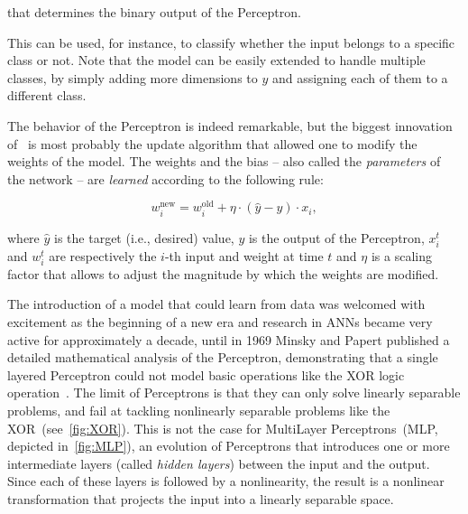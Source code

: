 \noindent that determines the binary output of the Perceptron.

This can be used, for instance, to classify whether the input belongs to a
specific class or not. Note that the model can be easily extended to handle
multiple classes, by simply adding more dimensions to $y$ and assigning each of
them to a different class.

The behavior of the Perceptron is indeed remarkable, but the biggest innovation
of~\cite{Rosenblatt57} is most probably the update algorithm that allowed one
to modify the weights of the model. The weights and the bias -- also called the
\emph{parameters} of the network -- are \emph{learned} according to the
following rule:

\begin{equation}\label{eq:perceptron_lr}
    w_i^{\text{new}} = w_i^{\text{old}} + \eta \cdot (\hat {y} - y) \cdot x_i,
\end{equation}

\noindent where $\hat y$ is the target (i.e., desired) value, $y$ is the output
of the Perceptron, $x_i^t$ and $w_i^t$ are respectively the $i$-th input and
weight at time $t$ and $\eta$ is a scaling factor that allows to adjust the
magnitude by which the weights are modified.

The introduction of a model that could learn from data
was welcomed with excitement as the beginning of a new era and
research in ANNs became very active for approximately a decade, until in
1969 Minsky and Papert published a detailed mathematical analysis of the
Perceptron, demonstrating that a single layered Perceptron could not model
basic operations like the XOR logic operation~\citep{Minsky69}. The limit of
Perceptrons is that they can only solve linearly separable problems, and fail
at tackling nonlinearly separable problems like the
XOR~(see~\autoref{fig:XOR}). This is not the case for MultiLayer
Perceptrons~(MLP, depicted in~\autoref{fig:MLP}), an evolution of Perceptrons
that introduces one or more intermediate layers (called \emph{hidden layers})
between the input and the output. Since each of these layers is followed by a
nonlinearity, the result is a nonlinear transformation that projects the input
into a linearly separable space.

